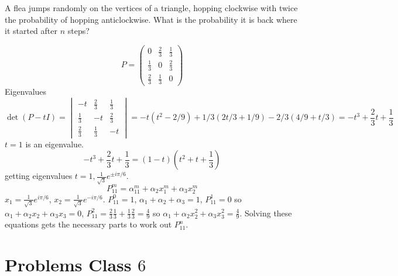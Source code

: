 \documentclass[10pt, a4paper]{article}
\begin{document}
\begin{problem}
    A flea jumps randomly on the vertices of a triangle,
    hopping clockwise with twice the probability of hopping anticlockwise.
    What is the probability it is back where it started after $n$ steps?

    \begin{solution}
        \[
        P = \begin{pmatrix}
            0 & \frac{2}{3} & \frac{1}{3} \\
            \frac{1}{3} & 0 & \frac{2}{3} \\
            \frac{2}{3} & \frac{1}{3} & 0
        \end{pmatrix}
        \]
        Eigenvalues
        \[
        \det(P - tI) = \begin{vmatrix}
            -t & \frac{2}{3} & \frac{1}{3} \\
            \frac{1}{3} & -t & \frac{2}{3} \\
            \frac{2}{3} & \frac{1}{3} & -t
        \end{vmatrix} = -t(t ^ 2 - 2 / 9) + 1 / 3(2t / 3 + 1 / 9) - 2 / 3(4 / 9 + t / 3) = -t ^ 3 + \frac{2}{3}t + \frac{1}{3}
        \]
        $t = 1$ is an eigenvalue.
        \[
        -t ^ 3 + \frac{2}{3}t + \frac{1}{3} = (1 - t)\left(t ^ 2 + t + \frac{1}{3}\right)
        \]
        getting eigenvalues $t = 1, \frac{1}{\sqrt{3}}e ^ {\pm i\pi / 6}$.
        \[
        P_{11}^{m} = \alpha_11 ^ m + \alpha_2x_1 ^ m + \alpha_3x_2 ^ m
        \]
        $x_1 = \frac{1}{\sqrt{3}}e ^ {i\pi / 6}$,
        $x_2 = \frac{1}{\sqrt{3}}e ^ {-i\pi / 6}$.
        $P_{11}^{0} = 1$,
        $\alpha_1 + \alpha_2 + \alpha_3 = 1$,
        $P_{11}^{1} = 0$ so $\alpha_1 + \alpha_2x_2 + \alpha_3x_3 = 0$,
        $P_{11}^{2} = \frac{2}{3}\frac{1}{3} + \frac{1}{3}\frac{2}{3} = \frac{4}{9}$ so $\alpha_1 + \alpha_2x_2 ^ 2 + \alpha_3x_3 ^ 2 = \frac{4}{9}$.
        Solving these equations gets the necessary parts to work out $P_{11}^{n}$.
    \end{solution}
\end{problem}

\newpage

\section{Problems Class \texorpdfstring{$6$}{}}
\end{document}
